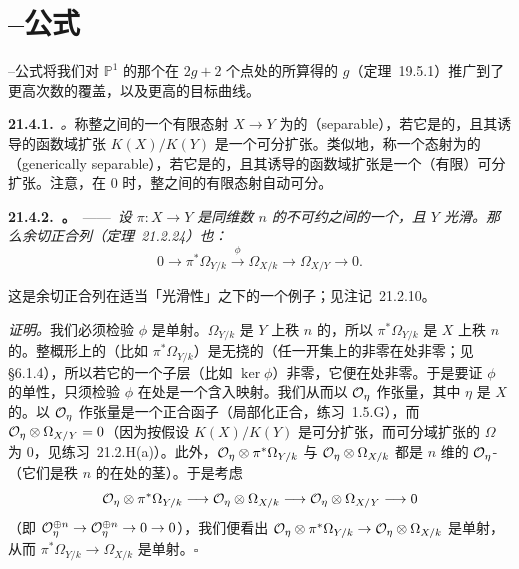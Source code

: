 
\section{\trRiemann--\trHurwitz{}公式}

\trRiemann--\trHurwitz{}公式将我们对 $\mathbb{P}^1$ 的那个在 $2g+2$ 个点处\trRamification{}的\trDoubleCover{}所算得的\trGenus{} $g$（\mbox{定理~19.5.1}）推广到了更高次数的覆盖，以及\trGenus{}更高的目标曲线。

\textbf{21.4.1.}\ \emph{\trhDefinition{}。}\quad 称整\trScheme{}之间的一个有限态射 $X\to Y$ 为\textbf{\trSeparable}的（separable），若它是\trDominant{}的，且其诱导的函数域扩张 $K(X)/K(Y)$ 是一个可分扩张。类似地，称一个\trGenericallyFinite{}态射为\textbf{\trGenericallySeparable}的（generically separable），若它是\trDominant{}的，且其诱导的函数域扩张是一个（有限）可分扩张。注意，在\trCharacteristic{} $0$ 时，整\trScheme{}之间的有限态射自动可分。

\textbf{21.4.2.\ \trhProposition。}\ ——\ \emph{设 $\pi\colon X\to Y$ 是同维数 $n$ 的不可约\trVariety{}之间的一个\trGenericallySeparable{}\trMorphism，且 $Y$ 光滑。那么余切正合列（\mbox{定理~21.2.24}）也\trLeftExact{}：}
\begin{equation*}\tag{21.4.2.1}\label{eq:cotangent-left-exact}
0\longrightarrow\pi^*\Omega_{Y/k}\xrightarrow{\ \phi\ }\Omega_{X/k}\longrightarrow\Omega_{X/Y}\longrightarrow 0.
\end{equation*}

这是余切正合列在适当「光滑性」之下\trLeftExactness{}的一个例子；见\mbox{注记~21.2.10}。

\emph{证明。}\quad 我们必须检验 $\phi$ 是单射。$\Omega_{Y/k}$ 是 $Y$ 上秩 $n$ 的\trLocallyFreeSheaf，所以 $\pi^*\Omega_{Y/k}$ 是 $X$ 上秩 $n$ 的\trLocallyFreeSheaf。整概形上的\trLocallyFreeSheaf（比如 $\pi^*\Omega_{Y/k}$）是无挠的（任一开集上的非零\trSection{}在\trGenericPoint{}处非零；见 \S6.1.4），所以若它的一个子层（比如 $\ker\phi$）非零，它便在\trGenericPoint{}处非零。于是要证 $\phi$ 的单性，只须检验 $\phi$ 在\trGenericPoint{}处是一个含入映射。我们从而以 $\mathcal{O}_\eta$ 作张量，其中 $\eta$ 是 $X$ 的\trGenericPoint。以 $\mathcal{O}_\eta$ 作张量是一个正合函子（局部化正合，\mbox{练习~1.5.G}），而 $\mathcal{O}_\eta\otimes\Omega_{X/Y}=0$（因为按假设 $K(X)/K(Y)$ 是可分扩张，而可分域扩张的 $\Omega$ 为 $0$，见\mbox{练习~21.2.H(a)}）。此外，$\mathcal{O}_\eta\otimes\pi^*\Omega_{Y/k}$ 与 $\mathcal{O}_\eta\otimes\Omega_{X/k}$ 都是 $n$ 维的 $\mathcal{O}_\eta$-\trVectorSpace（它们是秩 $n$ 的\trLocallyFreeSheaf{}在\trGenericPoint{}处的茎）。于是考虑
\[
\mathcal{O}_\eta\otimes\pi^*\Omega_{Y/k}\longrightarrow\mathcal{O}_\eta\otimes\Omega_{X/k}\longrightarrow\mathcal{O}_\eta\otimes\Omega_{X/Y}\longrightarrow 0
\]
（即 $\mathcal{O}_\eta^{\oplus n}\to\mathcal{O}_\eta^{\oplus n}\to 0\to 0$），我们便看出 $\mathcal{O}_\eta\otimes\pi^*\Omega_{Y/k}\to\mathcal{O}_\eta\otimes\Omega_{X/k}$ 是单射，从而 $\pi^*\Omega_{Y/k}\to\Omega_{X/k}$ 是单射。\hfill$\square$

